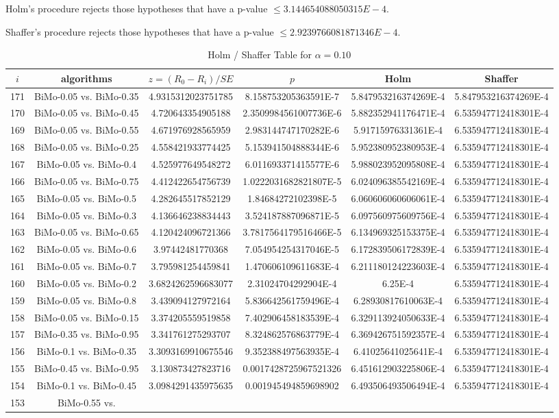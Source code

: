 \documentclass[a4paper,10pt]{article}
\begin{document}
\begin{landscape}
Holm's procedure rejects those hypotheses that have a p-value $\le3.144654088050315E-4$.


Shaffer's procedure rejects those hypotheses that have a p-value $\le2.9239766081871346E-4$.


\begin{table}[!htp]
\centering\tiny
\caption{Holm / Shaffer Table for $\alpha=0.10$}
\begin{tabular}{cccccc}
$i$&algorithms&$z=(R_0 - R_i)/SE$&$p$&Holm&Shaffer\\
\hline
171&BiMo-0.05 vs. BiMo-0.35&4.9315312023751785&8.158753205363591E-7&5.847953216374269E-4&5.847953216374269E-4\\170&BiMo-0.05 vs. BiMo-0.45&4.720643354905188&2.3509984561007736E-6&5.882352941176471E-4&6.535947712418301E-4\\169&BiMo-0.05 vs. BiMo-0.55&4.671976928565959&2.983144747170282E-6&5.91715976331361E-4&6.535947712418301E-4\\168&BiMo-0.05 vs. BiMo-0.25&4.558421933774425&5.153941504888344E-6&5.952380952380953E-4&6.535947712418301E-4\\167&BiMo-0.05 vs. BiMo-0.4&4.525977649548272&6.011693371415577E-6&5.988023952095808E-4&6.535947712418301E-4\\166&BiMo-0.05 vs. BiMo-0.75&4.412422654756739&1.0222031682821807E-5&6.024096385542169E-4&6.535947712418301E-4\\165&BiMo-0.05 vs. BiMo-0.5&4.282645517852129&1.84684272102398E-5&6.060606060606061E-4&6.535947712418301E-4\\164&BiMo-0.05 vs. BiMo-0.3&4.136646238834443&3.524187887096871E-5&6.097560975609756E-4&6.535947712418301E-4\\163&BiMo-0.05 vs. BiMo-0.65&4.120424096721366&3.7817564179516466E-5&6.134969325153375E-4&6.535947712418301E-4\\162&BiMo-0.05 vs. BiMo-0.6&3.97442481770368&7.054954254317046E-5&6.172839506172839E-4&6.535947712418301E-4\\161&BiMo-0.05 vs. BiMo-0.7&3.795981254459841&1.470606109611683E-4&6.211180124223603E-4&6.535947712418301E-4\\160&BiMo-0.05 vs. BiMo-0.2&3.6824262596683077&2.31024704292904E-4&6.25E-4&6.535947712418301E-4\\159&BiMo-0.05 vs. BiMo-0.8&3.439094127972164&5.836642561759496E-4&6.28930817610063E-4&6.535947712418301E-4\\158&BiMo-0.05 vs. BiMo-0.15&3.374205559519858&7.402906458183539E-4&6.329113924050633E-4&6.535947712418301E-4\\157&BiMo-0.35 vs. BiMo-0.95&3.341761275293707&8.324862576863779E-4&6.369426751592357E-4&6.535947712418301E-4\\156&BiMo-0.1 vs. BiMo-0.35&3.3093169910675546&9.352388497563935E-4&6.41025641025641E-4&6.535947712418301E-4\\155&BiMo-0.45 vs. BiMo-0.95&3.130873427823716&0.0017428725967521326&6.451612903225806E-4&6.535947712418301E-4\\154&BiMo-0.1 vs. BiMo-0.45&3.0984291435975635&0.001945494859698902&6.493506493506494E-4&6.535947712418301E-4\\153&BiMo-0.55 vs. 
\end{tabular}
\end{table}
\end{landscape}
\end{document}
